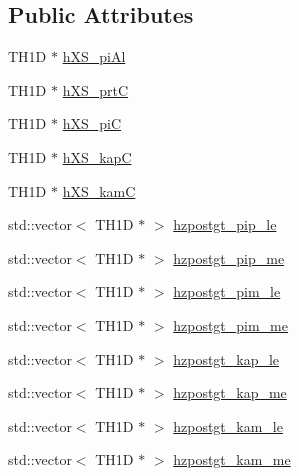 \subsection*{Public Attributes}
\begin{DoxyCompactItemize}
\item 
T\-H1\-D $\ast$ \hyperlink{class_neutrino_flux_reweight_1_1_attenuation_m_c_a7a9edf7fb1e5af0611eacfaba7d63879}{h\-X\-S\-\_\-pi\-Al}
\item 
T\-H1\-D $\ast$ \hyperlink{class_neutrino_flux_reweight_1_1_attenuation_m_c_a6a8883254ecc6e301643493923c3cde0}{h\-X\-S\-\_\-prt\-C}
\item 
T\-H1\-D $\ast$ \hyperlink{class_neutrino_flux_reweight_1_1_attenuation_m_c_aa7f4bb3745202fd3a48fb9e295317219}{h\-X\-S\-\_\-pi\-C}
\item 
T\-H1\-D $\ast$ \hyperlink{class_neutrino_flux_reweight_1_1_attenuation_m_c_afe67d35bfdea4d6b91bd6b16f7404bb2}{h\-X\-S\-\_\-kap\-C}
\item 
T\-H1\-D $\ast$ \hyperlink{class_neutrino_flux_reweight_1_1_attenuation_m_c_a89dfdfa2e55926db7bdc4ec685e0003e}{h\-X\-S\-\_\-kam\-C}
\item 
std\-::vector$<$ T\-H1\-D $\ast$ $>$ \hyperlink{class_neutrino_flux_reweight_1_1_attenuation_m_c_a96f19a370160ceee2c8bf61d93a34085}{hzpostgt\-\_\-pip\-\_\-le}
\item 
std\-::vector$<$ T\-H1\-D $\ast$ $>$ \hyperlink{class_neutrino_flux_reweight_1_1_attenuation_m_c_a4a4fe98dd8c926d1996b1bcf492b65cd}{hzpostgt\-\_\-pip\-\_\-me}
\item 
std\-::vector$<$ T\-H1\-D $\ast$ $>$ \hyperlink{class_neutrino_flux_reweight_1_1_attenuation_m_c_a8e2000306243ba7ee0e93814ded1c964}{hzpostgt\-\_\-pim\-\_\-le}
\item 
std\-::vector$<$ T\-H1\-D $\ast$ $>$ \hyperlink{class_neutrino_flux_reweight_1_1_attenuation_m_c_ada00bc8840f8c94bdf92796e7c87b103}{hzpostgt\-\_\-pim\-\_\-me}
\item 
std\-::vector$<$ T\-H1\-D $\ast$ $>$ \hyperlink{class_neutrino_flux_reweight_1_1_attenuation_m_c_aa62930aa4128449906cd2b661a063355}{hzpostgt\-\_\-kap\-\_\-le}
\item 
std\-::vector$<$ T\-H1\-D $\ast$ $>$ \hyperlink{class_neutrino_flux_reweight_1_1_attenuation_m_c_aec1b443980cc76c016d34149707d0961}{hzpostgt\-\_\-kap\-\_\-me}
\item 
std\-::vector$<$ T\-H1\-D $\ast$ $>$ \hyperlink{class_neutrino_flux_reweight_1_1_attenuation_m_c_af7f31787553e49e1803626c24e722277}{hzpostgt\-\_\-kam\-\_\-le}
\item 
std\-::vector$<$ T\-H1\-D $\ast$ $>$ \hyperlink{class_neutrino_flux_reweight_1_1_attenuation_m_c_ace0dd74d05ab00993b319e53087f2ce2}{hzpostgt\-\_\-kam\-\_\-me}
\end{DoxyCompactItemize}
